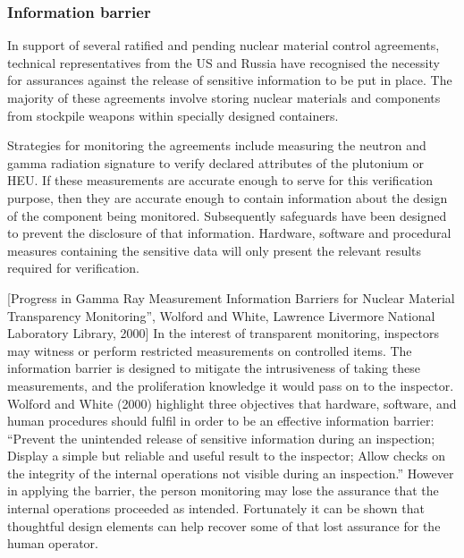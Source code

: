\documentclass[twoside,titlepage,11pt,twocolumn,a4paper]{article}
\begin{document}
\subsubsection{Information barrier}
In support of several ratified and pending nuclear material control
agreements, technical representatives from the US and Russia have
recognised the necessity for assurances against the release of
sensitive information to be put in place.  The majority of these
agreements involve storing nuclear materials and components from
stockpile weapons within specially designed containers.

Strategies for monitoring the agreements include measuring the neutron
and gamma radiation signature to verify declared attributes of the
plutonium or HEU.  If these measurements are accurate enough to serve
for this verification purpose, then they are accurate enough to
contain information about the design of the component being
monitored. Subsequently safeguards have been designed to prevent the
disclosure of that information. Hardware, software and procedural
measures containing the sensitive data will only present the relevant
results required for verification.

[Progress in Gamma Ray Measurement Information Barriers for Nuclear
  Material Transparency Monitoring'', Wolford and White, Lawrence
  Livermore National Laboratory Library, 2000] In the interest of
transparent monitoring, inspectors may witness or perform restricted
measurements on controlled items. The information barrier is designed
to mitigate the intrusiveness of taking these measurements, and the
proliferation knowledge it would pass on to the inspector. Wolford and
White (2000) highlight three objectives that hardware, software, and
human procedures should fulfil in order to be an effective information
barrier: ``Prevent the unintended release of sensitive information
during an inspection; Display a simple but reliable and useful result
to the inspector; Allow checks on the integrity of the internal
operations not visible during an inspection.''  However in applying
the barrier, the person monitoring may lose the assurance that the
internal operations proceeded as intended. Fortunately it can be shown
that thoughtful design elements can help recover some of that lost
assurance for the human operator.
\end{document}
